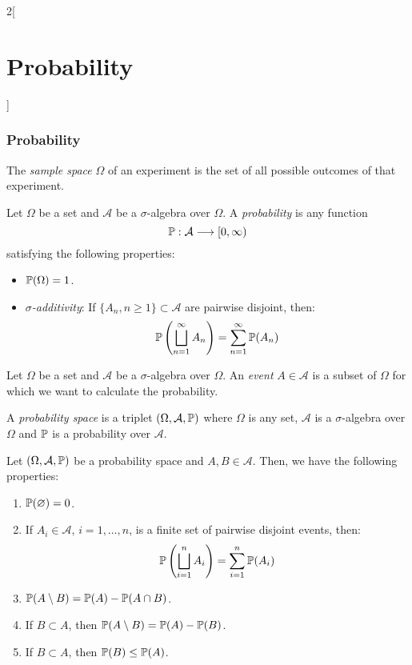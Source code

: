 \documentclass[../../../main.tex]{subfiles}
\begin{document}
\begin{multicols}{2}[\section{Probability}]
  \subsubsection{Probability}
  \begin{definition}
    The \emph{sample space} $\Omega$ of an experiment is the set of all possible outcomes of that experiment.
  \end{definition}
  \begin{definition}
    Let $\Omega$ be a set and $\mathcal{A}$ be a $\sigma$-algebra over $\Omega$. A \emph{probability} is any function $$\mathbb{P}:\mathcal{A}\longrightarrow[0,\infty)$$ satisfying the following properties:
    \begin{itemize}
      \item $\mathbb{P}(\Omega)=1$.
      \item \emph{$\sigma$-additivity}: If $\{A_n,n\geq1\}\subset\mathcal{A}$ are pairwise disjoint, then: $$\mathbb{P}\left(\bigsqcup_{n=1}^\infty A_n\right)=\sum_{n=1}^\infty \mathbb{P}(A_n)$$
    \end{itemize}
  \end{definition}
  \begin{definition}
    Let $\Omega$ be a set and $\mathcal{A}$ be a $\sigma$-algebra over $\Omega$. An \emph{event} $A\in\mathcal{A}$ is a subset of $\Omega$ for which we want to calculate the probability.
  \end{definition}
  \begin{definition}
    A \emph{probability space} is a triplet $(\Omega,\mathcal{A},\mathbb{P})$ where $\Omega$ is any set, $\mathcal{A}$ is a $\sigma$-algebra over $\Omega$ and $\mathbb{P}$ is a probability over $\mathcal{A}$.
  \end{definition}
  \begin{proposition}
    Let $(\Omega,\mathcal{A},\mathbb{P})$ be a probability space and $A,B\in\mathcal{A}$. Then, we have the following properties:
    \begin{enumerate}
      \item $\mathbb{P}(\varnothing)=0$.
      \item If $A_i\in\mathcal{A}$, $i=1,\ldots,n$, is a finite set of pairwise disjoint events, then: $$\mathbb{P}\left(\bigsqcup_{i=1}^n A_i\right)=\sum_{i=1}^n \mathbb{P}(A_i)$$
      \item $\mathbb{P}(A\setminus B) =\mathbb{P}(A)-\mathbb{P}(A\cap B)$.
      \item If $B\subset A$, then $\mathbb{P}(A\setminus B)=\mathbb{P}(A)-\mathbb{P}(B)$.
      \item If $B\subset A$, then $\mathbb{P}(B)\leq \mathbb{P}(A)$.

\end{enumerate}
\end{proposition}
\end{multicols}
\end{document}
